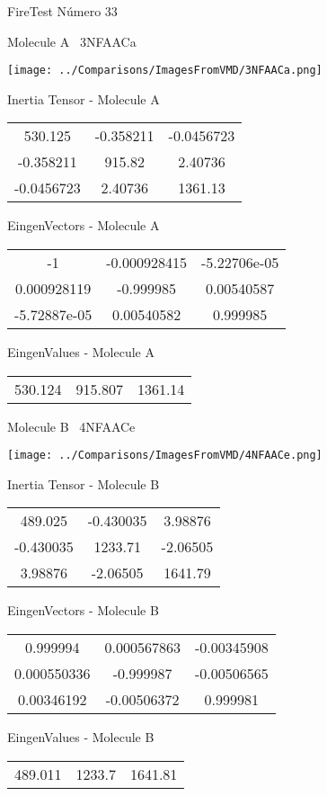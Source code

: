\vtab[-3cm]
\begin{center}
{\large FireTest \tab Número 33}
\end{center}
\begin{multicols}{2}
\begin{center}

Molecule A \
3NFAACa

\texttt{[image: ../Comparisons/ImagesFromVMD/3NFAACa.png]}

Inertia Tensor - Molecule A \\
\begin{tabular}{|c c c|}
530.125	 & 	-0.358211	 & 	-0.0456723	 \\
-0.358211	 & 	915.82	 & 	2.40736	 \\
-0.0456723	 & 	2.40736	 & 	1361.13
\end{tabular}

\vtab
 EingenVectors - Molecule A     \\
\begin{tabular}{|c c c|}
-1	 & 	-0.000928415	 & 	-5.22706e-05	 \\
0.000928119	 & 	-0.999985	 & 	0.00540587	 \\
-5.72887e-05	 & 	0.00540582	 & 	0.999985
\end{tabular}

\vtab
 EingenValues - Molecule A     \\
\begin{tabular}{|c c c|}
530.124	 & 	915.807	 & 	1361.14	 \\
\end{tabular}
\columnbreak

Molecule B \
4NFAACe

\texttt{[image: ../Comparisons/ImagesFromVMD/4NFAACe.png]}

Inertia Tensor - Molecule B \\
\begin{tabular}{|c c c|}
489.025	 & 	-0.430035	 & 	3.98876	 \\
-0.430035	 & 	1233.71	 & 	-2.06505	 \\
3.98876	 & 	-2.06505	 & 	1641.79
\end{tabular}

\vtab
 EingenVectors - Molecule B     \\
\begin{tabular}{|c c c|}
0.999994	 & 	0.000567863	 & 	-0.00345908	 \\
0.000550336	 & 	-0.999987	 & 	-0.00506565	 \\
0.00346192	 & 	-0.00506372	 & 	0.999981
\end{tabular}

\vtab
 EingenValues - Molecule B     \\
\begin{tabular}{|c c c|}
489.011	 & 	1233.7	 & 	1641.81	 \\
\end{tabular}

\end{center}
\end{multicols}

